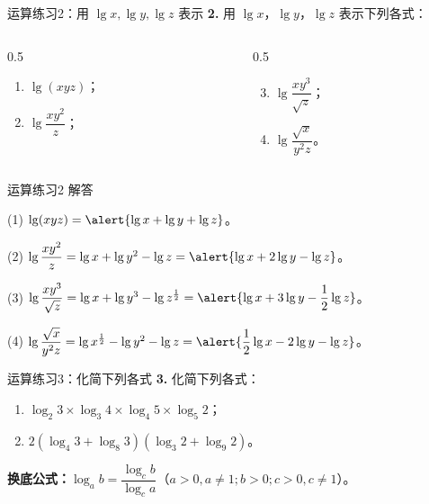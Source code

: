 \documentclass[10pt,aspectratio=169,serif]{beamer}
\begin{document}
\begin{frame}[t]{运算练习2：用 $\lg x, \lg y, \lg z$ 表示}
\textbf{2.} 用 $\lg x$，$\lg y$，$\lg z$ 表示下列各式：

\vspace{0.5em}
\begin{columns}[t]
\begin{column}{0.5\textwidth}
\begin{enumerate}
  \item $\lg(xyz)$；
  \item $\lg\dfrac{xy^2}{z}$；
\end{enumerate}
\end{column}
\begin{column}{0.5\textwidth}
\begin{enumerate}\setcounter{enumi}{2}
  \item $\lg\dfrac{xy^3}{\sqrt{z}}$；
  \item $\lg\dfrac{\sqrt{x}}{y^2 z}$。
\end{enumerate}
\end{column}
\end{columns}
\end{frame}

\begin{frame}[t]{运算练习2 解答}
\begin{tcolorbox}[colback=orange!10,colframe=orange,title=\textbf{解}]
(1) $\lg(xyz) = \alert{\lg x + \lg y + \lg z}$。

(2) $\lg\dfrac{xy^2}{z} = \lg x + \lg y^2 - \lg z = \alert{\lg x + 2\lg y - \lg z}$。

(3) $\lg\dfrac{xy^3}{\sqrt{z}} = \lg x + \lg y^3 - \lg z^{\frac{1}{2}} = \alert{\lg x + 3\lg y - \dfrac{1}{2}\lg z}$。

(4) $\lg\dfrac{\sqrt{x}}{y^2 z} = \lg x^{\frac{1}{2}} - \lg y^2 - \lg z = \alert{\dfrac{1}{2}\lg x - 2\lg y - \lg z}$。
\end{tcolorbox}
\end{frame}

\begin{frame}[t]{运算练习3：化简下列各式}
\textbf{3.} 化简下列各式：

\vspace{0.5em}
\begin{enumerate}
  \item $\log_2 3 \times \log_3 4 \times \log_4 5 \times \log_5 2$；
  \vspace{0.5em}
  \item $2(\log_4 3 + \log_8 3)(\log_3 2 + \log_9 2)$。
\end{enumerate}

\vspace{1em}
\small\textbf{换底公式：}$\log_a b = \dfrac{\log_c b}{\log_c a}$（$a>0,a\neq 1;b>0;c>0,c\neq 1$）。
\end{frame}
\end{document}
